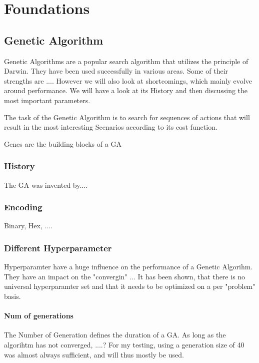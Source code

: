 \chapter{Foundations}
\label{chap:foundation}

\section{Genetic Algorithm}
\label{chap:foundation:genetic_algorithm}
Genetic Algorithms are a popular search algorithm that utilizes the principle of Darwin. They have been used successfully in various areas.
Some of their strengths are ....
However we will also look at shortcomings, which mainly evolve around performance.
We will have a look at its History and then discussing the most important parameters.

The task of the Genetic Algorithm is to search for sequences of actions that will result in the most interesting Scenarios according to its cost function.

Genes are the building blocks of a GA

\subsection{History}
The GA was invented by....


\subsection{Encoding}
\label{chap:foundation:ga:encoding}
Binary, Hex, ....

\subsection{Different Hyperparameter}
Hyperparamter have a huge influence on the performance of a Genetic Algorihm. They have an impact on the "convergin" ...
It has been shown, that there is no universal hyperparamter set and that it needs to be optimized on a per "problem" basis.

\subsubsection{Num of generations}
The Number of Generation defines the duration of a GA. As long as the algorihtm has not converged, ....?
For my testing, using a generation size of 40 was almost always sufficient, and will thus mostly be used.

